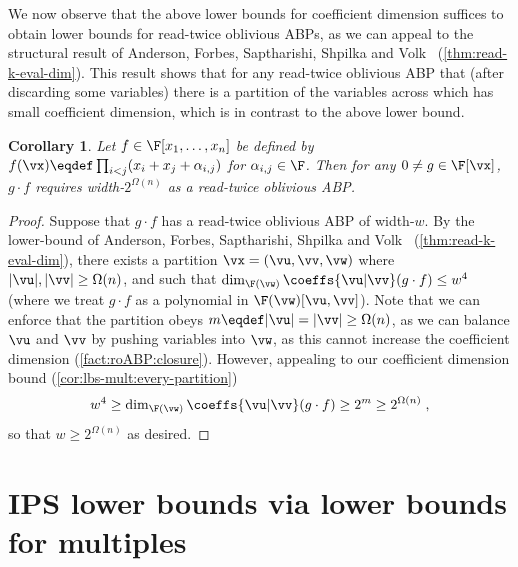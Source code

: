 \documentclass[11pt]{article}
\numberwithin{equation}{section}
\newtheorem{corollary}[theorem]{Corollary}
\theoremstyle{definition}
\theoremstyle{plain}
\begin{document}
We now observe that the above lower bounds for coefficient dimension suffices to obtain lower bounds for read-twice oblivious ABPs, as we can appeal to the structural result of Anderson, Forbes, Saptharishi, Shpilka and Volk~\cite{AndersonFSSV16} (\autoref{thm:read-k-eval-dim}).  This result shows that for any read-twice oblivious ABP that (after discarding some variables) there is a partition of the variables across which has small coefficient dimension, which is in contrast to the above lower bound.

\begin{corollary}\label{cor:r2abp-multiples}
        Let $f\in\F[x_1,\ldots,x_n]$ be defined by $f(\vx)\eqdef\prod_{i<j}(x_i+x_j+\alpha_{i,j})$ for $\alpha_{i,j}\in\F$.  Then for any $0\ne g\in\F[\vx]$, $g\cdot f$ requires width-$2^{\Omega(n)}$ as a read-twice oblivious ABP.
\end{corollary}
\begin{proof}
        Suppose that $g\cdot f$ has a read-twice oblivious ABP of width-$w$. By the lower-bound of Anderson, Forbes, Saptharishi, Shpilka and Volk~\cite{AndersonFSSV16} (\autoref{thm:read-k-eval-dim}), there exists a partition $\vx=(\vu,\vv,\vw)$ where $|\vu|,|\vv|\ge\Omega(n)$, and such that $\dim_{\F(\vw)}\coeffs{\vu|\vv}(g\cdot f)\le w^4$ (where we treat $g\cdot f$ as a polynomial in $\F(\vw)[\vu,\vv]$).  Note that we can  enforce that the partition obeys $m\eqdef|\vu|=|\vv|\ge\Omega(n)$, as we can balance $\vu$ and $\vv$ by pushing variables into $\vw$, as this cannot increase the coefficient dimension (\autoref{fact:roABP:closure}). However, appealing to our coefficient dimension bound (\autoref{cor:lbs-mult:every-partition})
        \[
                w^4\ge\dim_{\F(\vw)}\coeffs{\vu|\vv}(g\cdot f)\ge 2^m\ge 2^{\Omega(n)}
                \;,
        \]
        so that $w\ge2^{\Omega(n)}$ as desired.
\end{proof}

\section{IPS lower bounds via lower bounds for multiples}\label{sec:ips-mult}
\end{document}
